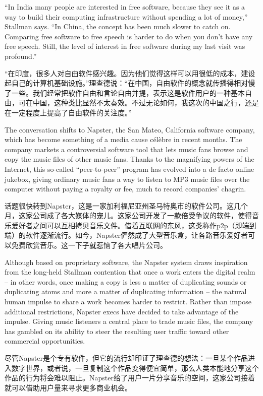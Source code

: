 \ifdefined\eng
``In India many people are interested in free software, because they see it as a way to build their computing infrastructure without spending a lot of money,'' Stallman says. ``In China, the concept has been much slower to catch on. Comparing free software to free speech is harder to do when you don't have any free speech. Still, the level of interest in free software during my last visit was profound.''
\fi

\ifdefined\chs
“在印度，很多人对自由软件感兴趣。因为他们觉得这样可以用很低的成本，建设起自己的计算机基础设施。”理查德说：“在中国，自由软件的概念就传播得相对慢了一些。我们经常把软件自由和言论自由并提，表示这是软件用户的一种基本自由，可在中国，这种类比显然不太奏效。不过无论如何，我这次的中国之行，还是在一定程度上提高了自由软件的关注度。”
\fi

\ifdefined\eng
The conversation shifts to Napster, the San Mateo, California software company, which has become something of a media cause célèbre in recent months. The company markets a controversial software tool that lets music fans browse and copy the music files of other music fans. Thanks to the magnifying powers of the Internet, this so-called ``peer-to-peer'' program has evolved into a de facto online jukebox, giving ordinary music fans a way to listen to MP3 music files over the computer without paying a royalty or fee, much to record companies' chagrin.
\fi

\ifdefined\chs
话题很快转到Napster，这是一家加利福尼亚州圣马特奥市的软件公司。这几个月，这家公司成了各大媒体的宠儿。这家公司开发了一款倍受争议的软件，使得音乐爱好者之间可以互相拷贝音乐文件。借着互联网的东风，这类称作p2p（即端到端）的软件逐渐流行。如今，Napster俨然成了大型音乐盒，让各路音乐爱好者可以免费欣赏音乐。这一下子就惹恼了各大唱片公司。
\fi

\ifdefined\eng
Although based on proprietary software, the Napster system draws inspiration from the long-held Stallman contention that once a work enters the digital realm -- in other words, once making a copy is less a matter of duplicating sounds or duplicating atoms and more a matter of duplicating information -- the natural human impulse to share a work becomes harder to restrict. Rather than impose additional restrictions, Napster execs have decided to take advantage of the impulse. Giving music listeners a central place to trade music files, the company has gambled on its ability to steer the resulting user traffic toward other commercial opportunities.
\fi

\ifdefined\chs
尽管Napster是个专有软件，但它的流行却印证了理查德的想法：一旦某个作品进入数字世界，或者说，一旦复制这个作品变得便宜简单，那么人类本能地分享这个作品的行为将会难以阻止。Napster给了用户一片分享音乐的空间，这家公司接着就可以借助用户量来寻求更多商业机会。
\fi

